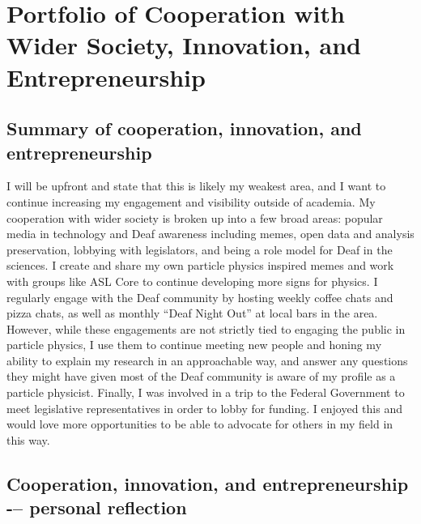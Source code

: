 \chapter{Portfolio of Cooperation with Wider Society, Innovation, and Entrepreneurship}

\section{Summary of cooperation, innovation, and entrepreneurship} \label{sec:summary-of-cooperation-innovation-and-entrepreneurship}

I will be upfront and state that this is likely my weakest area, and I want to continue increasing my engagement and visibility outside of academia. My cooperation with wider society is broken up into a few broad areas: popular media in technology and Deaf awareness including memes, open data and analysis preservation, lobbying with legislators, and being a role model for Deaf in the sciences. I create and share my own particle physics inspired memes and work with groups like ASL Core to continue developing more signs for physics. I regularly engage with the Deaf community by hosting weekly coffee chats and pizza chats, as well as monthly \enquote{Deaf Night Out} at local bars in the area. However, while these engagements are not strictly tied to engaging the public in particle physics, I use them to continue meeting new people and honing my ability to explain my research in an approachable way, and answer any questions they might have given most of the Deaf community is aware of my profile as a particle physicist. Finally, I was involved in a trip to the Federal Government to meet legislative representatives in order to lobby for funding. I enjoyed this and would love more opportunities to be able to advocate for others in my field in this way.

\section{Cooperation, innovation, and entrepreneurship -– personal reflection} \label{sec:cooperation-innovation-and-entrepreneurship-personal-reflection}

